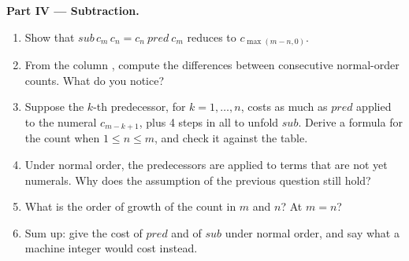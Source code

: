 \begin{problem}
\medskip\noindent\textbf{Part IV --- Subtraction.}
\begin{enumerate}[resume]
\item Show that $\mathit{sub}\,c_m\,c_n = c_n\ \mathit{pred}\ c_m$ reduces to $c_{\max(m - n, 0)}$.
\item From the column , compute the differences between consecutive normal-order counts. What do you notice?
\item Suppose the $k$-th predecessor, for $k = 1, \dots, n$, costs as much as $\mathit{pred}$ applied to the numeral $c_{m - k + 1}$, plus 4 steps in all to unfold $\mathit{sub}$. Derive a formula for the count when $1 \le n \le m$, and check it against the table.
\item Under normal order, the predecessors are applied to terms that are not yet numerals. Why does the assumption of the previous question still hold?
\item What is the order of growth of the count in $m$ and $n$? At $m = n$?
\item Sum up: give the cost of $\mathit{pred}$ and of $\mathit{sub}$ under normal order, and say what a machine integer would cost instead.
\end{enumerate}
\end{problem}
